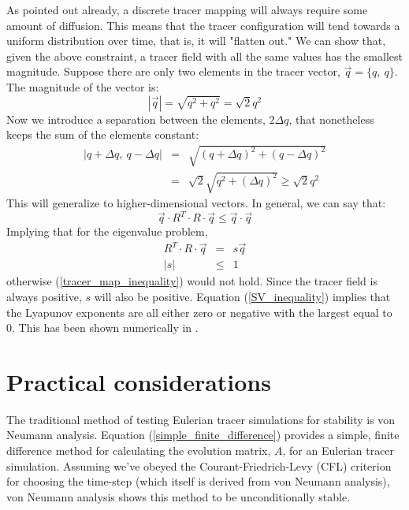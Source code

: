 \documentclass[12pt]{article}
\begin{document}
As pointed out already, a discrete tracer mapping will always require some 
amount of diffusion.  This means that the tracer configuration will 
tend towards a uniform distribution over time, 
that is, it will "flatten out."  We can
show that, given the above constraint, a tracer field with all the same values
 has the smallest magnitude.  Suppose there are only two elements in the 
tracer vector, $\vec q=\lbrace q,~q \rbrace$.  The magnitude of the vector is:
\begin{equation}
|\vec q|=\sqrt{q^2+q^2}=\sqrt{2} q^2
\end{equation}
Now we introduce a separation between the elements, $2\Delta q$, that 
nonetheless keeps the sum of the elements constant:
\begin{eqnarray}
|q+\Delta q,~q-\Delta q| & = & \sqrt{(q+\Delta q)^2+(q-\Delta q)^2} \\
& = & \sqrt{2}\sqrt{q^2+(\Delta q)^2} \ge \sqrt{2} q^2
\end{eqnarray}
This will generalize to higher-dimensional vectors.  In general, we can
say that:
\begin{equation}
\vec q \cdot R^T \cdot R \cdot \vec q \le \vec q \cdot \vec q
\label{tracer_map_inequality}
\end{equation}
Implying that for the eigenvalue problem,
\begin{eqnarray}
R^T \cdot R \cdot \vec q & = & s \vec q \nonumber\\
|s| & \le & 1 \label{SV_inequality}
\end{eqnarray}
otherwise (\ref{tracer_map_inequality}) would not hold.
Since the tracer field is always positive, $s$ will also be positive.
Equation (\ref{SV_inequality}) implies that the Lyapunov exponents are all
either zero or negative with the largest equal to 0.  This has been shown
numerically in \citet{Mills2012}.

\section{Practical considerations}

The traditional method of testing Eulerian tracer simulations for stability
is von Neumann analysis.
Equation (\ref{simple_finite_difference}) provides a simple, finite
difference method for
calculating the evolution matrix, $A$, for an Eulerian tracer simulation.
Assuming we've obeyed the Courant-Friedrich-Levy (CFL) criterion for choosing
the time-step (which itself is derived from von Neumann analysis), von Neumann
analysis shows this method to be unconditionally stable.
\end{document}

